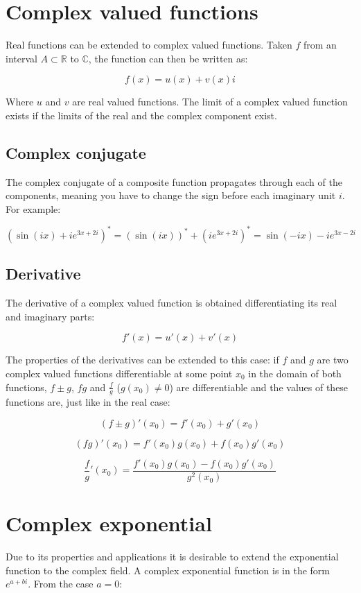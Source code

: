 \section{Complex valued functions}
Real functions can be extended to complex valued functions.
Taken $f$ from an interval $A\subset\mathbb{R}$ to $\mathbb{C}$, the function can then be written as:

$$f(x) = u(x) + v(x)i$$

Where $u$ and $v$ are real valued functions.
The limit of a complex valued function exists if the limits of the real and the complex component exist.
    
    \subsection{Complex conjugate}
    The complex conjugate of a composite function propagates through each of the components, meaning you have to change the sign before each imaginary unit $i$. For example:

    $$(\sin(ix) + ie^{3x + 2i})^* = (\sin(ix))^* + (ie^{3x + 2i})^* = \sin(-ix) - ie^{3x - 2i}$$

	\subsection{Derivative}
	The derivative of a complex valued function is obtained differentiating its real and imaginary parts:

	$$f'(x) = u'(x) + v'(x)$$

	The properties of the derivatives can be extended to this case: if $f$ and $g$ are two complex valued functions differentiable at some point $x_0$ in the domain of both functions, $f\pm g$, $fg$ and $\frac{f}{g}$ ($g(x_0)\neq 0$) are differentiable and the values of these functions are, just like in the real case:

	$$(f\pm g)'(x_0) = f'(x_0) + g'(x_0)$$

	$$(fg)'(x_0) = f'(x_0)g(x_0) + f(x_0)g'(x_0)$$

	$$\frac{f}{g}'(x_0) = \frac{f'(x_0)g(x_0)-f(x_0)g'(x_0)}{g^2(x_0)}$$

\section{Complex exponential}
Due to its properties and applications it is desirable to extend the exponential function to the complex field.
A complex exponential function is in the form $e^{a+bi}$.
From the case $a = 0$:

